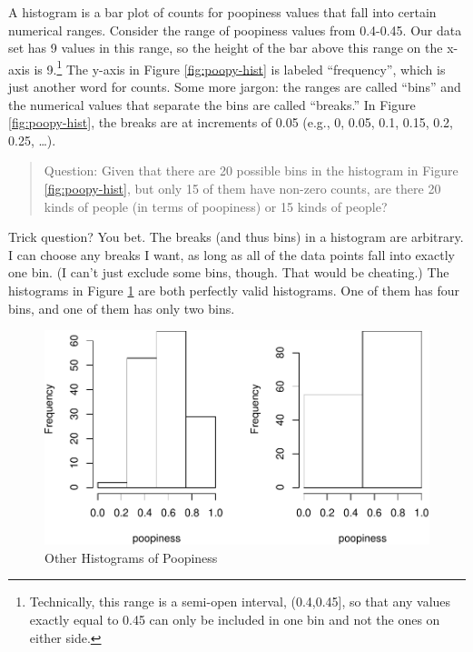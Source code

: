 \documentclass[]{book}
\let\rmarkdownfootnote\footnote%
\def\footnote{\protect\rmarkdownfootnote}
\begin{document}
A histogram is a bar plot of counts for poopiness values that fall into certain numerical ranges.
Consider the range of poopiness values from 0.4-0.45. Our data set has 9 values in this range, so the height of the bar above this range on the x-axis is 9.\footnote{Technically, this range is a semi-open interval, (0.4,0.45{]}, so that any values exactly equal to 0.45 can only be included in one bin and not the ones on either side.} The y-axis in Figure \ref{fig:poopy-hist} is labeled ``frequency'', which is just another word for counts. Some more jargon: the ranges are called ``bins'' and the numerical values that separate the bins are called ``breaks.'' In Figure \ref{fig:poopy-hist}, the breaks are at increments of 0.05 (e.g., 0, 0.05, 0.1, 0.15, 0.2, 0.25, \ldots{}).

\begin{quote}
Question: Given that there are 20 possible bins in the histogram in Figure \ref{fig:poopy-hist}, but only 15 of them have non-zero counts, are there 20 kinds of people (in terms of poopiness) or 15 kinds of people?
\end{quote}

Trick question? You bet. The breaks (and thus bins) in a histogram are arbitrary. I can choose any breaks I want, as long as all of the data points fall into exactly one bin. (I can't just exclude some bins, though. That would be cheating.) The histograms in Figure \ref{fig:poopy-hist-alt} are both perfectly valid histograms. One of them has four bins, and one of them has only two bins.

\begin{figure}
\centering
\includegraphics{bigquestions-book_files/figure-latex/poopy-hist-alt-1.pdf}
\caption{\label{fig:poopy-hist-alt}Other Histograms of Poopiness}
\end{figure}
\end{document}
